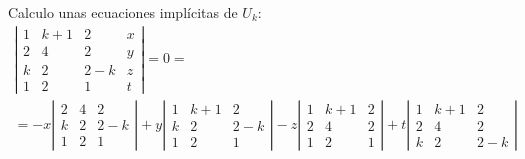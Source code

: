 \documentclass[12pt]{article}
\begin{document}
\begin{ejercicio}
\begin{enumerate}
\begin{itemize}
            Calculo unas ecuaciones implícitas de $U_k$:
            \begin{multline*}
                \left|\begin{array}{cccc}
                    1 & k+1 & 2 & x \\
                    2 & 4 & 2 & y \\
                    k & 2 & 2-k & z \\
                    1 & 2 & 1 & t
                \end{array}\right| = 0 =\\
                =-x\left|\begin{array}{ccc}
                    2 & 4 & 2 \\
                    k & 2 & 2-k \\
                    1 & 2 & 1
                \end{array}\right|
                +y\left|\begin{array}{ccc}
                    1 & k+1 & 2 \\
                    k & 2 & 2-k \\
                    1 & 2 & 1
                \end{array}\right|
                -z\left|\begin{array}{ccc}
                    1 & k+1 & 2 \\
                    2 & 4 & 2 \\
                    1 & 2 & 1
                \end{array}\right|
                +t\left|\begin{array}{ccc}
                    1 & k+1 & 2 \\
                    2 & 4 & 2 \\
                    k & 2 & 2-k
                \end{array}\right|
            \end{multline*}


\end{itemize}
\end{enumerate}
\end{ejercicio}
\end{document}
